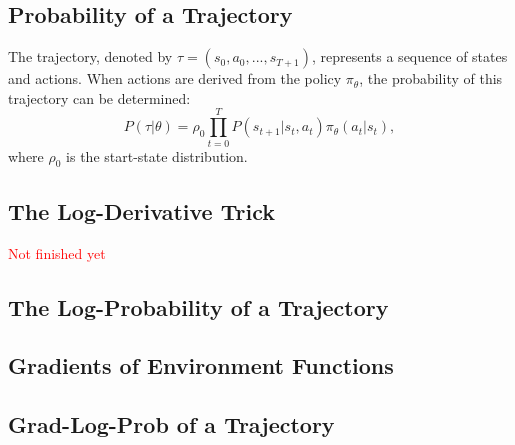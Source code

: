 \subsection{Probability of a Trajectory}
The trajectory, denoted by $\tau = (s_0, a_0, ..., s_{T+1})$, represents a sequence of states and actions. When actions are derived from the policy $\pi_{\theta}$, the probability of this trajectory can be determined:
$$
P(\tau|\theta) = \rho_0 \prod_{t=0}^{T} P(s_{t+1}|s_t, a_t) \pi_{\theta}(a_t |s_t),$$
where $\rho_0 $  is the start-state distribution.

\subsection{The Log-Derivative Trick} \textcolor{red}{Not finished yet}


\subsection{The Log-Probability of a Trajectory}


\subsection{Gradients of Environment Functions}


\subsection{Grad-Log-Prob of a Trajectory}

